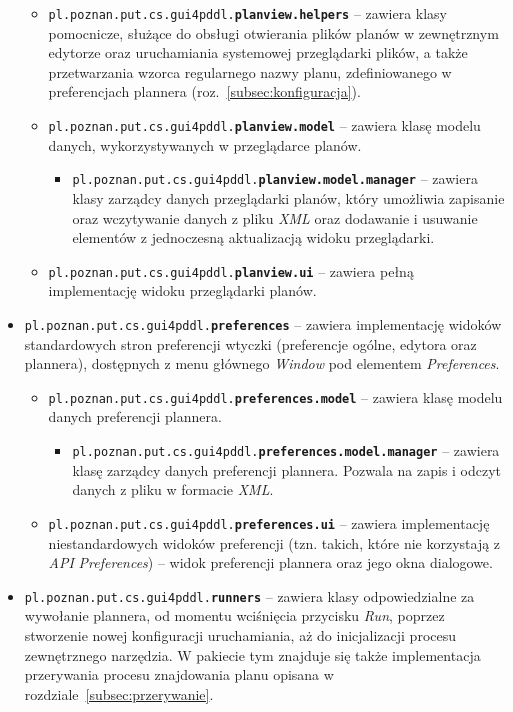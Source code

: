 \begin{itemize}
\begin{itemize}
\item \texttt{pl.poznan.put.cs.gui4pddl.\textbf{planview.helpers}} -- zawiera klasy pomocnicze, służące do obsługi otwierania plików planów w zewnętrznym edytorze oraz uruchamiania systemowej przeglądarki plików, a także przetwarzania wzorca regularnego nazwy planu, zdefiniowanego w preferencjach plannera (roz.~\ref{subsec:konfiguracja}).
\item \texttt{pl.poznan.put.cs.gui4pddl.\textbf{planview.model}} -- zawiera klasę modelu danych, wykorzystywanych w przeglądarce planów.
\begin{itemize}
\item \texttt{pl.poznan.put.cs.gui4pddl.\textbf{planview.model.manager}} -- zawiera klasy zarządcy danych przeglądarki planów, który umożliwia zapisanie oraz wczytywanie danych z pliku \textit{XML} oraz dodawanie i usuwanie elementów z jednoczesną aktualizacją widoku przeglądarki.
\end{itemize}
\item \texttt{pl.poznan.put.cs.gui4pddl.\textbf{planview.ui}} -- zawiera pełną implementację widoku przeglądarki planów.
\end{itemize}
\item \texttt{pl.poznan.put.cs.gui4pddl.\textbf{preferences}} -- zawiera implementację widoków standardowych stron preferencji wtyczki (preferencje ogólne, edytora oraz plannera), dostępnych z menu głównego \textit{Window} pod elementem \textit{Preferences}.
\begin{itemize}
\item \texttt{pl.poznan.put.cs.gui4pddl.\textbf{preferences.model}} -- zawiera klasę modelu danych preferencji plannera.
\begin{itemize}
\item \texttt{pl.poznan.put.cs.gui4pddl.\textbf{preferences.model.manager}} -- zawiera klasę zarządcy danych preferencji plannera. Pozwala na zapis i odczyt danych z pliku w formacie \textit{XML}.
\end{itemize}
\item \texttt{pl.poznan.put.cs.gui4pddl.\textbf{preferences.ui}} -- zawiera implementację niestandardowych widoków preferencji (tzn. takich, które nie korzystają z \textit{API} \textit{Preferences}) -- widok preferencji plannera oraz jego okna dialogowe.
\end{itemize}
\item \texttt{pl.poznan.put.cs.gui4pddl.\textbf{runners}} -- zawiera klasy odpowiedzialne za wywołanie plannera, od momentu wciśnięcia przycisku \textit{Run}, poprzez stworzenie nowej konfiguracji uruchamiania, aż do inicjalizacji procesu zewnętrznego narzędzia. W pakiecie tym znajduje się także implementacja przerywania procesu znajdowania planu opisana w rozdziale~\ref{subsec:przerywanie}.

\end{itemize}
